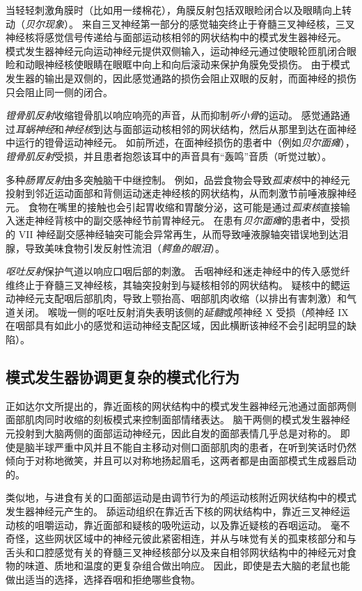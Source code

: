 当轻轻刺激角膜时（比如用一缕棉花），角膜反射包括双眼睑闭合以及眼睛向上转动（\textit{贝尔现象}）。
来自三叉神经第一部分的感觉轴突终止于脊髓三叉神经核，三叉神经核将感觉信号传递给与面部运动核相邻的网状结构中的模式发生器神经元。
模式发生器神经元向运动神经元提供双侧输入，运动神经元通过使眼轮匝肌闭合眼睑和动眼神经核使眼睛在眼眶中向上和向后滚动来保护角膜免受损伤。
由于模式发生器的输出是双侧的，因此感觉通路的损伤会阻止双眼的反射，而面神经的损伤只会阻止同一侧的闭合。


\textit{镫骨肌反射}收缩镫骨肌以响应响亮的声音，从而抑制\textit{听小骨}的运动。
感觉通路通过\textit{耳蜗神经}和\textit{神经核}到达与面部运动核相邻的网状结构，然后从那里到达在面神经中运行的镫骨运动神经元。
如前所述，在面神经损伤的患者中（例如\textit{贝尔面瘫}），\textit{镫骨肌反射}受损，并且患者抱怨该耳中的声音具有“轰鸣”音质（听觉过敏）。


多种\textit{肠胃反射}由多突触脑干中继控制。
例如，品尝食物会导致\textit{孤束核}中的神经元投射到邻近运动面部和背侧运动迷走神经核的网状结构，从而刺激节前唾液腺神经元。
食物在嘴里的接触也会引起胃收缩和胃酸分泌，这可能是通过\textit{孤束核}直接输入迷走神经背核中的副交感神经节前胃神经元。
在患有\textit{贝尔面瘫}的患者中，受损的 VII 神经副交感神经轴突可能会异常再生，从而导致唾液腺轴突错误地到达泪腺，导致美味食物引发反射性流泪（\textit{鳄鱼的眼泪}）。


\textit{呕吐反射}保护气道以响应口咽后部的刺激。
舌咽神经和迷走神经中的传入感觉纤维终止于脊髓三叉神经核，其轴突投射到与疑核相邻的网状结构。
疑核中的鳃运动神经元支配咽后部肌肉，导致上颚抬高、咽部肌肉收缩（以排出有害刺激）和气道关闭。
喉咙一侧的呕吐反射消失表明该侧的\textit{延髓}或颅神经 X 受损（颅神经 IX 在咽部具有如此小的感觉和运动神经支配区域，因此横断该神经不会引起明显的缺陷）。



\subsection{模式发生器协调更复杂的模式化行为}

正如达尔文所提出的，靠近面核的网状结构中的模式发生器神经元池通过面部两侧面部肌肉同时收缩的刻板模式来控制面部情绪表达。
脑干两侧的模式发生器神经元投射到大脑两侧的面部运动神经元，因此自发的面部表情几乎总是对称的。
即使是脑半球严重中风并且不能自主移动对侧口面部肌肉的患者，在听到笑话时仍然倾向于对称地微笑，并且可以对称地扬起眉毛，这两者都是由面部模式生成器启动的。


类似地，与进食有关的口面部运动是由调节行为的颅运动核附近网状结构中的模式发生器神经元产生的。
舔运动组织在靠近舌下核的网状结构中，靠近三叉神经运动核的咀嚼运动，靠近面部和疑核的吸吮运动，以及靠近疑核的吞咽运动。
毫不奇怪，这些网状区域中的神经元彼此紧密相连，并从与味觉有关的孤束核部分和与舌头和口腔感觉有关的脊髓三叉神经核部分以及来自相邻网状结构中的神经元对食物的味道、质地和温度的更复杂组合做出响应。
因此，即使是去大脑的老鼠也能做出适当的选择，选择吞咽和拒绝哪些食物。


